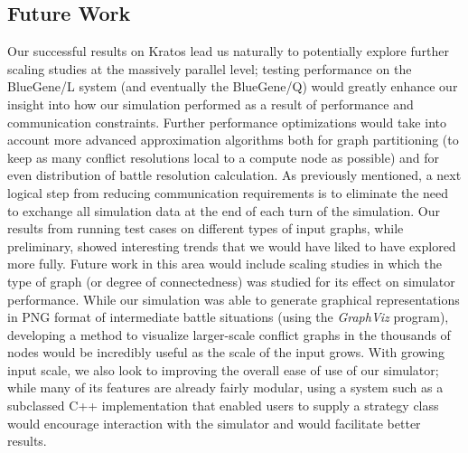 \documentclass[10pt]{article}
\begin{document}
\begin{multicols}{2}
		\section*{Future Work}

		Our successful results on Kratos lead us naturally to potentially explore further scaling studies at the massively parallel level; testing performance on the BlueGene/L system (and eventually the BlueGene/Q) would greatly enhance our insight into how our simulation performed as a result of performance and communication constraints.  
		Further performance optimizations would take into account more advanced approximation algorithms both for graph partitioning (to keep as many conflict resolutions local to a compute node as possible) and for even distribution of battle resolution calculation.  
		As previously mentioned, a next logical step from reducing communication requirements is to eliminate the need to exchange all simulation data at the end of each turn of the simulation.  
		Our results from running test cases on different types of input graphs, while preliminary, showed interesting trends that we would have liked to have explored more fully.  
		Future work in this area would include scaling studies in which the type of graph (or degree of connectedness) was studied for its effect on simulator performance.
		While our simulation was able to generate graphical representations in PNG format of intermediate battle situations (using the \emph{GraphViz} program), developing a method to visualize larger-scale conflict graphs in the thousands of nodes would be incredibly useful as the scale of the input grows.  
		With growing input scale, we also look to improving the overall ease of use of our simulator; while many of its features are already fairly modular, using a system such as a subclassed C++ implementation that enabled users to supply a strategy class would encourage interaction with the simulator and would facilitate better results. 

	\end{multicols}
\end{document}
